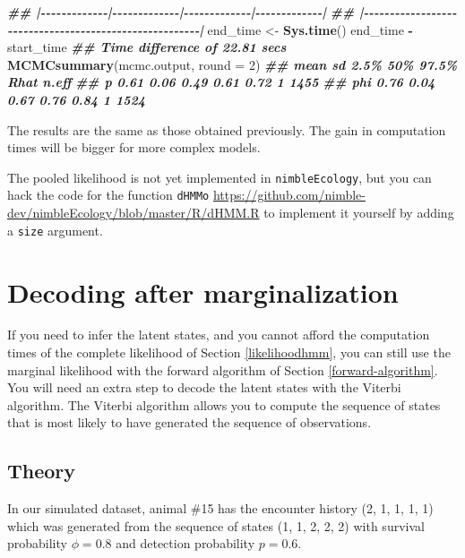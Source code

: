 \documentclass[
  12pt,
]{krantz}
\newenvironment{Shaded}{\begin{snugshade}}{\end{snugshade}}
\newcommand{\AttributeTok}[1]{\textcolor[rgb]{0.13,0.29,0.53}{#1}}
\newcommand{\DecValTok}[1]{\textcolor[rgb]{0.00,0.00,0.81}{#1}}
\newcommand{\DocumentationTok}[1]{\textcolor[rgb]{0.56,0.35,0.01}{\textbf{\textit{#1}}}}
\newcommand{\FunctionTok}[1]{\textcolor[rgb]{0.13,0.29,0.53}{\textbf{#1}}}
\newcommand{\NormalTok}[1]{#1}
\newcommand{\OtherTok}[1]{\textcolor[rgb]{0.56,0.35,0.01}{#1}}
\newcommand{\SpecialCharTok}[1]{\textcolor[rgb]{0.81,0.36,0.00}{\textbf{#1}}}
\begin{document}
\begin{Shaded}
\begin{Highlighting}[]
\DocumentationTok{\#\# |{-}{-}{-}{-}{-}{-}{-}{-}{-}{-}{-}{-}{-}|{-}{-}{-}{-}{-}{-}{-}{-}{-}{-}{-}{-}{-}|{-}{-}{-}{-}{-}{-}{-}{-}{-}{-}{-}{-}{-}|{-}{-}{-}{-}{-}{-}{-}{-}{-}{-}{-}{-}{-}|}
\DocumentationTok{\#\# |{-}{-}{-}{-}{-}{-}{-}{-}{-}{-}{-}{-}{-}{-}{-}{-}{-}{-}{-}{-}{-}{-}{-}{-}{-}{-}{-}{-}{-}{-}{-}{-}{-}{-}{-}{-}{-}{-}{-}{-}{-}{-}{-}{-}{-}{-}{-}{-}{-}{-}{-}{-}{-}{-}{-}|}
\NormalTok{end\_time }\OtherTok{\textless{}{-}} \FunctionTok{Sys.time}\NormalTok{()}
\NormalTok{end\_time }\SpecialCharTok{{-}}\NormalTok{ start\_time}
\DocumentationTok{\#\# Time difference of 22.81 secs}
\FunctionTok{MCMCsummary}\NormalTok{(mcmc.output, }\AttributeTok{round =} \DecValTok{2}\NormalTok{)}
\DocumentationTok{\#\#     mean   sd 2.5\%  50\% 97.5\% Rhat n.eff}
\DocumentationTok{\#\# p   0.61 0.06 0.49 0.61  0.72    1  1455}
\DocumentationTok{\#\# phi 0.76 0.04 0.67 0.76  0.84    1  1524}
\end{Highlighting}
\end{Shaded}

The results are the same as those obtained previously. The gain in computation times will be bigger for more complex models.

The pooled likelihood is not yet implemented in \texttt{nimbleEcology}, but you can hack the code for the function \texttt{dHMMo} \url{https://github.com/nimble-dev/nimbleEcology/blob/master/R/dHMM.R} to implement it yourself by adding a \texttt{size} argument.

\section{Decoding after marginalization}\label{decoding}

If you need to infer the latent states, and you cannot afford the computation times of the complete likelihood of Section \ref{likelihoodhmm}, you can still use the marginal likelihood with the forward algorithm of Section \ref{forward-algorithm}. You will need an extra step to decode the latent states with the Viterbi algorithm. The Viterbi algorithm allows you to compute the sequence of states that is most likely to have generated the sequence of observations.

\subsection{Theory}\label{viterbi-theory}

In our simulated dataset, animal \#15 has the encounter history (2, 1, 1, 1, 1) which was generated from the sequence of states (1, 1, 2, 2, 2) with survival probability \(\phi = 0.8\) and detection probability \(p = 0.6\).
\end{document}
